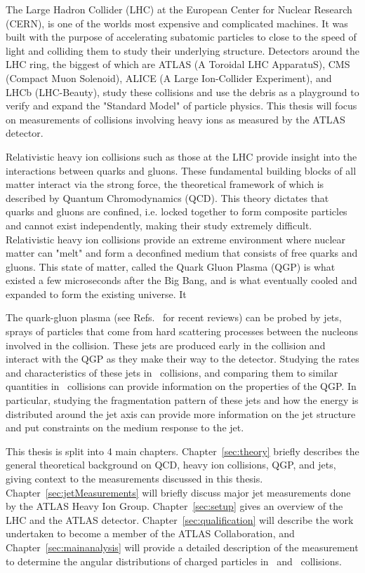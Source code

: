 

The Large Hadron Collider (LHC) at the European Center for Nuclear Research (CERN), is one of the worlds most expensive and complicated machines. It was built with the purpose of accelerating subatomic particles to close to the speed of light and colliding them to study their underlying structure. Detectors around the LHC ring, the biggest of which are  ATLAS (A Toroidal LHC ApparatuS), CMS (Compact Muon Solenoid), ALICE (A Large Ion-Collider Experiment), and LHCb (LHC-Beauty), study these collisions and use the debris as a playground to verify and expand the "Standard Model" of particle physics. This thesis will focus on measurements of collisions involving heavy ions as measured by the ATLAS detector.

Relativistic heavy ion collisions such as those at the LHC provide insight into the interactions between quarks and gluons. These fundamental building blocks of all matter interact via the strong force, the theoretical framework of which is described by Quantum Chromodynamics (QCD). This theory dictates that quarks and gluons are confined, i.e. locked together to form composite particles and cannot exist independently, making their study extremely difficult. Relativistic heavy ion collisions provide an extreme environment where nuclear matter can "melt" and form a deconfined medium that consists of free quarks and gluons. This state of matter, called the Quark Gluon Plasma (QGP) is what existed a few microseconds after the Big Bang, and is what eventually cooled and expanded to form the existing universe. It

The quark-gluon plasma (see Refs.~\cite{Roland:2014jsa,Busza:2018rrf} for recent reviews) can be probed by jets, sprays of particles that come from hard scattering processes between the nucleons involved in the collision. These jets are produced early in the collision and interact with the QGP as they make their way to the detector. Studying the rates and characteristics of these jets in \pbpb\ collisions, and comparing them to similar quantities in \pp\ collisions can provide information on the properties of the QGP. In particular, studying the  fragmentation pattern of these jets and how the energy is distributed around the jet axis can provide more information on the jet structure and put constraints on the medium response to the jet.

This thesis is split into 4 main chapters. Chapter~\ref{sec:theory} briefly describes the general theoretical background on QCD, heavy ion collisions, QGP, and jets, giving context to the measurements discussed in this thesis. Chapter~\ref{sec:jetMeasurements} will briefly discuss major jet measurements done by the ATLAS Heavy Ion Group. Chapter~\ref{sec:setup} gives an overview of the LHC and the ATLAS detector. Chapter~\ref{sec:qualification} will describe the work undertaken to become a member of the ATLAS Collaboration, and Chapter~\ref{sec:mainanalysis} will provide a detailed description of the measurement to determine the angular distributions of charged particles in \pbpb\ and \pp\ collisions. 





